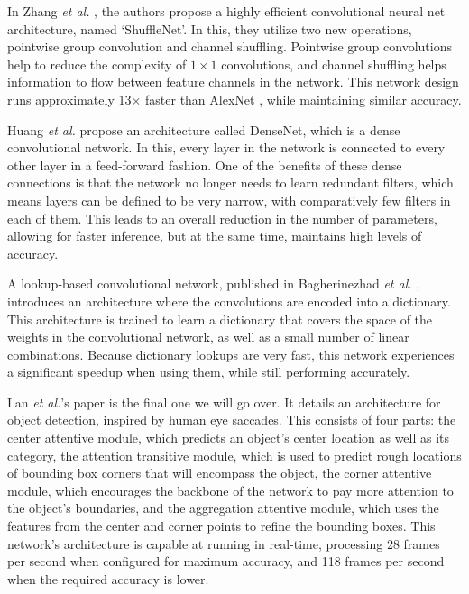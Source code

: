 \documentclass[11pt,a4paper,oldfontcommands]{memoir}
\begin{document}

In Zhang \textit{et al.} \cite{Shuffle}, the authors propose a highly efficient convolutional neural net architecture, named `ShuffleNet'. In this, they utilize two new operations, pointwise group convolution and channel shuffling. Pointwise group convolutions help to reduce the complexity of $1\times1$ convolutions, and channel shuffling helps information to flow between feature channels in the network. This network design runs approximately 13$\times$ faster than AlexNet \cite{alex}, while maintaining similar accuracy.

Huang \textit{et al.} \cite{DCConv} propose an architecture called DenseNet, which is a dense convolutional network. In this, every layer in the network is connected to every other layer in a feed-forward fashion. One of the benefits of these dense connections is that the network no longer needs to learn redundant filters, which means layers can be defined to be very narrow, with comparatively few filters in each of them. This leads to an overall reduction in the number of parameters, allowing for faster inference, but at the same time, maintains high levels of accuracy. 

A lookup-based convolutional network, published in Bagherinezhad \textit{et al.} \cite{LCNN}, introduces an architecture where the convolutions are encoded into a dictionary. This architecture is trained to learn a dictionary that covers the space of the weights in the convolutional network, as well as a small number of linear combinations. Because dictionary lookups are very fast, this network experiences a significant speedup when using them, while still performing accurately.

Lan \textit{et al.}'s paper \cite{Sacc} is the final one we will go over. It details an architecture for object detection, inspired by human eye saccades. This consists of four parts: the center attentive module, which predicts an object's center location as well as its category, the attention transitive module, which is used to predict rough locations of bounding box corners that will encompass the object, the corner attentive module, which encourages the backbone of the network to pay more attention to the object's boundaries, and the aggregation attentive module, which uses the features from the center and corner points to refine the bounding boxes. This network's architecture is capable at running in real-time, processing 28 frames per second when configured for maximum accuracy, and 118 frames per second when the required accuracy is lower. 
\end{document}
